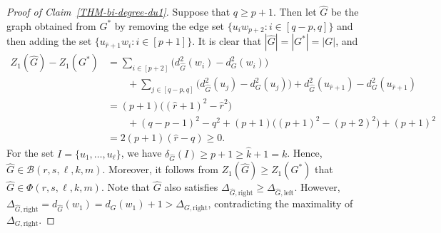 \documentclass[10pt,a4paper]{amsart}
\begin{document}
\begin{proof}[Proof of Claim~\ref{THM-bi-degree-du1}]
        Suppose that $q \ge p+1$. 
        Then let $\hat{G}$ be the graph obtained from $G^{\ast}$ by removing the edge set $\{u_i w_{p+2} \colon i \in [q-p, q]\}$ and then adding the set $\{u_{\hat{r}+1} w_i \colon i \in [p+1]\}$. 
        It is clear that $|\hat{G}| = |G^{\ast}| = |G|$, and 
        \begin{align*}
            Z_{1}(\hat{G}) - Z_{1}(G^{\ast})
            & = \sum_{i \in [p+2]} \big( d_{\hat{G}}^{2}(w_i) - d_{G}^{2}(w_i) \big) \\
            & \qquad + \sum_{j \in [q-p, q]} \big( d_{\hat{G}}^{2}(u_j) - d_{G}^{2}(u_j) \big) + d_{\hat{G}}^{2}(u_{\hat{r}+1}) - d_{G}^{2}(u_{\hat{r}+1}) \\
            & = (p+1)\big( (\hat{r}+1)^2 - \hat{r}^2 \big) \\
            & \qquad + (q-p-1)^2 - q^2 + (p+1) \big( (p+1)^2 - (p+2)^2 \big) + (p+1)^2 \\
            & = 2(p+1)(\hat{r} - q)
            \ge 0. 
        \end{align*}
        For the set $I = \{u_1, \ldots,u_{\ell}\}$, we have $\delta_{\hat{G}}(I) \ge p+1 \ge \hat{k}+1 =k$. 
        Hence, $\hat{G} \in \mathcal{B}(r,s,\ell,k,m)$. 
        Moreover, it follows from $Z_{1}(\hat{G}) \ge Z_{1}(G^{\ast})$ that $\hat{G} \in \Phi(r,s,\ell,k,m)$. 
        Note that $\hat{G}$ also satisfies $\Delta_{\hat{G}, \mathrm{right}} \ge \Delta_{\hat{G}, \mathrm{left}}$. 
        However, $\Delta_{\hat{G},\mathrm{right}} = d_{\hat{G}}(w_1) = d_{G}(w_1) + 1 > \Delta_{G,\mathrm{right}}$, contradicting the maximality of $\Delta_{G,\mathrm{right}}$. 


\end{proof}
\end{document}
